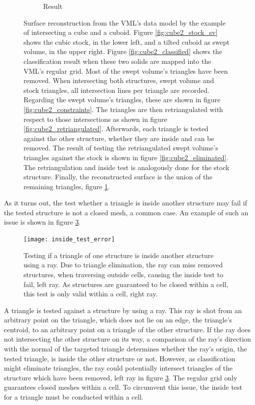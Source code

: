 \begin{figure}
\begin{subfigure}[t]{0.3\textwidth}
		\caption{Result}
		\label{fig:cube2_result}
	\end{subfigure}
	\caption{
		Surface reconstruction from the VML's data model by the example of intersecting a cube and a cuboid.
		Figure \ref{fig:cube2_stock_sv} shows the cubic stock, in the lower left, and a tilted cuboid as swept volume, in the upper right.
		Figure \ref{fig:cube2_classified} shows the classification result when these two solids are mapped into the VML's regular grid.
		Most of the swept volume's triangles have been removed.
		When intersecting both structures, \ie swept volume and stock triangles, all intersection lines per triangle are recorded.
		Regarding the swept volume's triangles, these are shown in figure \ref{fig:cube2_constraints}.
		The triangles are then retriangulated with respect to those intersections as shown in figure \ref{fig:cube2_retriangulated}.
		Afterwards, each triangle is tested against the other structure, whether they are inside and can be removed.
		The result of testing the retriangulated swept volume's triangles against the stock is shown in figure \ref{fig:cube2_eliminated}.
		The retriangulation and inside test is analogously done for the stock structure.
		Finally, the reconstructed surface is the union of the remaining triangles, figure \ref{fig:cube2_result}.
	}
	\label{fig:cube2}
\end{figure}

As it turns out, the test whether a triangle is inside another structure may fail if the tested structure is not a closed mesh, a common case.
An example of such an issue is shown in figure \ref{fig:inside_test_error}.
%
\begin{figure}
	\centering
	\texttt{[image: inside\_test\_error]}
	\caption{
		Testing if a triangle of one structure is inside another structure using a ray.
		Due to triangle elimination, the ray can miss removed structures, \eg when traversing outside cells, causing the inside test to fail, \cf left ray.
		As structures are guaranteed to be closed within a cell, this test is only valid within a cell, \cf right ray.
	}
	\label{fig:inside_test_error}
\end{figure}
%
A triangle is tested against a structure by using a ray.
This ray is shot from an arbitrary point on the triangle, which does not lie on an edge, \eg the triangle's centroid, to an arbitrary point on a triangle of the other structure.
If the ray does not intersecting the other structure on its way, a comparison of the ray's direction with the normal of the targeted triangle determines whether the ray's origin, the tested triangle, is inside the other structure or not.
However, as classification might eliminate triangles, the ray could potentially intersect triangles of the structure which have been removed, \cf left ray in figure \ref{fig:inside_test_error}.
The regular grid only guarantees closed meshes within a cell.
To circumvent this issue, the inside test for a triangle must be conducted within a cell.

